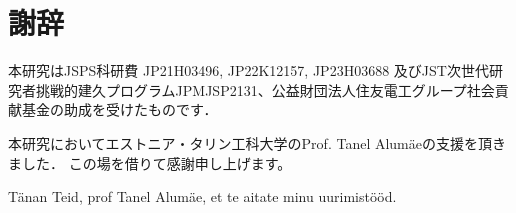 \chapter*{謝辞}

本研究はJSPS科研費 JP21H03496, JP22K12157, JP23H03688 及びJST次世代研究者挑戦的建久プログラムJPMJSP2131、公益財団法人住友電工グループ社会貢献基金の助成を受けたものです．

本研究においてエストニア・タリン工科大学のProf. Tanel Alumäeの支援を頂きました．
この場を借りて感謝申し上げます。

Tänan Teid, prof Tanel Alumäe, et te aitate minu uurimistööd.
